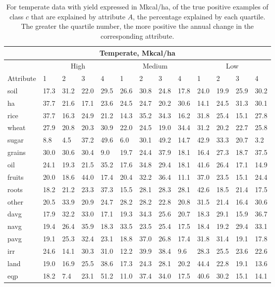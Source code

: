 \documentclass[12pt,twoside]{article}
\begin{document}
\begin{table}
\centering
\begin{tabular}{lllllllllllll}
\toprule
\multicolumn{13}{c}{\textbf{Temperate, Mkcal/ha}} \\
\midrule
& \multicolumn{4}{c}{High} & \multicolumn{4}{c}{Medium} & \multicolumn{4}{c}{Low} \\
\cmidrule(lr){2-5}
\cmidrule(lr){6-9}
\cmidrule(l){10-13}
Attribute & 1 & 2 & 3 & 4 & 1 & 2 & 3 & 4 & 1 & 2 & 3 & 4 \\
\midrule
soil & 17.3 & 31.2 & 22.0 & 29.5 & 26.6 & 30.8 & 24.8 & 17.8 & 24.0 & 19.9 & 25.9 & 30.2 \\
ha & 37.7 & 21.6 & 17.1 & 23.6 & 24.5 & 24.7 & 20.2 & 30.6 & 14.1 & 24.5 & 31.3 & 30.1 \\
rice & 37.7 & 16.3 & 24.9 & 21.2 & 14.3 & 35.2 & 34.3 & 16.2 & 31.8 & 25.4 & 15.1 & 27.8 \\
wheat & 27.9 & 20.8 & 20.3 & 30.9 & 22.0 & 24.5 & 19.0 & 34.4 & 31.2 & 20.2 & 22.7 & 25.8 \\
sugar & 8.8 & 4.5 & 37.2 & 49.6 & 6.0 & 30.1 & 49.2 & 14.7 & 42.9 & 33.3 & 20.7 & 3.2 \\
grains & 30.0 & 30.6 & 30.4 & 9.0 & 19.7 & 24.4 & 37.9 & 18.1 & 16.4 & 27.3 & 18.7 & 37.5 \\
oil & 24.1 & 19.3 & 21.5 & 35.2 & 17.6 & 34.8 & 29.4 & 18.1 & 41.6 & 26.4 & 17.1 & 14.9 \\
fruits & 20.0 & 18.6 & 44.0 & 17.4 & 20.4 & 32.2 & 36.4 & 11.1 & 37.0 & 23.5 & 15.1 & 24.4 \\
roots & 18.2 & 21.2 & 23.3 & 37.3 & 15.5 & 28.1 & 28.3 & 28.1 & 42.6 & 18.5 & 21.4 & 17.5 \\
other & 20.5 & 33.9 & 20.9 & 24.7 & 28.2 & 28.2 & 22.8 & 20.8 & 31.5 & 21.4 & 16.4 & 30.6 \\
davg & 17.9 & 32.2 & 33.0 & 17.1 & 19.3 & 34.3 & 25.6 & 20.7 & 18.3 & 29.1 & 15.9 & 36.7 \\
navg & 19.4 & 26.4 & 35.9 & 18.3 & 33.5 & 23.5 & 25.4 & 17.5 & 18.4 & 19.2 & 29.4 & 33.1 \\
pavg & 19.1 & 25.3 & 32.4 & 23.1 & 18.8 & 37.0 & 26.8 & 17.4 & 31.8 & 31.4 & 19.1 & 17.8 \\
irr & 24.6 & 14.1 & 30.3 & 31.0 & 12.2 & 39.9 & 38.4 & 9.6 & 28.3 & 25.5 & 23.6 & 22.6 \\
land & 19.0 & 16.9 & 25.5 & 38.6 & 17.3 & 24.3 & 28.1 & 20.2 & 44.4 & 22.8 & 19.1 & 13.6 \\
eqp & 18.2 & 7.4 & 23.1 & 51.2 & 11.0 & 37.4 & 34.0 & 17.5 & 40.6 & 30.2 & 15.1 & 14.1 \\
\bottomrule
\end{tabular}
\captionsetup{width=.7\textwidth}
\caption[Percentage of Examples Explained by Quartile (Temperate, Mkcal/ha)]{For temperate data with yield expressed in Mkcal/ha, of the true positive examples of class $c$ that are explained by attribute $A$, the percentage explained by each quartile. The greater the quartile number, the more positive the annual change in the corresponding attribute.}
\label{k.ny.temp.quartiles}
\end{table}
\end{document}
